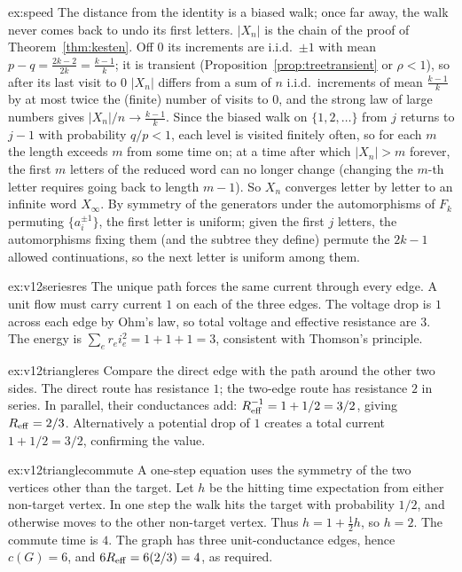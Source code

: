\begin{solution}{ex:speed}
\idea The distance from the identity is a biased walk; once far away, the walk never comes back to undo its first letters.
\writeup $|X_n|$ is the chain of the proof of Theorem~\ref{thm:kesten}. Off $0$ its increments are i.i.d.\ $\pm1$ with mean $p-q=\frac{2k-2}{2k}=\frac{k-1}k$; it is transient (Proposition~\ref{prop:treetransient} or $\rho<1$), so after its last visit to $0$
$|X_n|$ differs from a sum of $n$ i.i.d.\ increments of mean $\frac{k-1}k$ by at most twice the (finite) number of visits to $0$, and the strong law of large numbers gives $|X_n|/n\to\frac{k-1}k$. Since the biased walk on $\{1,2,\dots\}$ from $j$ returns to $j-1$ with probability $q/p<1$, each
level is visited finitely often, so for each $m$ the length exceeds $m$ from some time on; at a time after which $|X_n|>m$ forever, the first $m$ letters of the reduced word can no longer change (changing the $m$-th
letter requires going back to length $m-1$). So $X_n$ converges letter by letter to an infinite word $X_\infty$. By symmetry of the generators under the automorphisms of $F_k$ permuting $\{a_i^{\pm1}\}$, the first letter is
uniform; given the first $j$ letters, the automorphisms fixing them (and the subtree they define) permute the $2k-1$ allowed continuations, so the next letter is uniform among them.
\end{solution}

\begin{solution}{ex:v12seriesres}
\idea The unique path forces the same current through every edge.
\writeup A unit flow must carry current $1$ on each of the three edges. The voltage drop is $1$ across each edge by Ohm's law, so total voltage and effective resistance are $3$. The energy is $\sum_e r_ei_e^2=1+1+1=3$, consistent with Thomson's principle.
\end{solution}

\begin{solution}{ex:v12triangleres}
\idea Compare the direct edge with the path around the other two sides.
\writeup The direct route has resistance $1$; the two-edge route has resistance $2$ in series. In parallel, their conductances add: $R_{\rm eff}^{-1}=1+1/2=3/2$, giving $R_{\rm eff}=2/3$. Alternatively a potential drop of $1$ creates a total current $1+1/2=3/2$, confirming the value.
\end{solution}

\begin{solution}{ex:v12trianglecommute}
\idea A one-step equation uses the symmetry of the two vertices other than the target.
\writeup Let $h$ be the hitting time expectation from either non-target vertex. In one step the walk hits the target with probability $1/2$, and otherwise moves to the other non-target vertex. Thus $h=1+\frac12h$, so $h=2$. The commute time is $4$. The graph has three unit-conductance edges, hence $c(G)=6$, and $6R_{\rm eff}=6(2/3)=4$, as required.
\end{solution}

